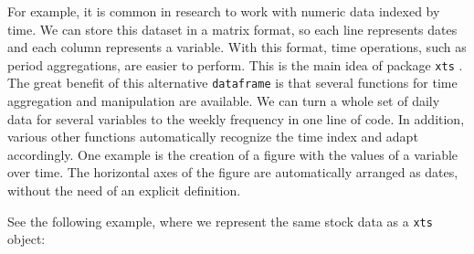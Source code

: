 \documentclass[11pt,]{book}
\begin{document}
For example, it is common in research to work with numeric data indexed
by time. We can store this dataset in a matrix format, so each line
represents dates and each column represents a variable. With this
format, time operations, such as period aggregations, are easier to
perform. This is the main idea of package \texttt{xts} \citep{xts2014}.
The great benefit of this alternative \texttt{dataframe} is that several
functions for time aggregation and manipulation are available. We can
turn a whole set of daily data for several variables to the weekly
frequency in one line of code. In addition, various other functions
automatically recognize the time index and adapt accordingly. One
example is the creation of a figure with the values of a variable over
time. The horizontal axes of the figure are automatically arranged as
dates, without the need of an explicit definition. 

See the following example, where we represent the same stock data as a
\texttt{xts} object: 
\end{document}

